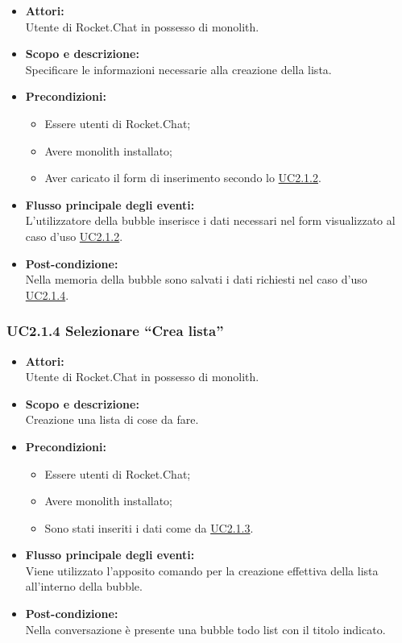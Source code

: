 \begin{itemize}
	\item \textbf{Attori:}
	\\Utente di Rocket.Chat in possesso di monolith.
	\item \textbf{Scopo e descrizione:} 
	\\Specificare le informazioni necessarie alla creazione della lista.
	\item \textbf{Precondizioni:}
	\begin{itemize}
		\item Essere utenti di Rocket.Chat;
		\item Avere monolith installato;
		\item Aver caricato il form di inserimento secondo lo \hyperref[UC2.1.2]{UC2.1.2}.
	\end{itemize}
	\item \textbf{Flusso principale degli eventi:}
	\\L'utilizzatore della bubble inserisce i dati necessari nel form visualizzato al caso d’uso \hyperref[UC2.1.2]{UC2.1.2}.
	\item \textbf{Post-condizione:}
	\\Nella memoria della bubble sono salvati i dati richiesti nel caso d’uso \hyperref[UC2.1.4]{UC2.1.4}. 
\end{itemize}

\subsubsection{UC2.1.4 Selezionare “Crea lista”} \label{UC2.1.4}

\begin{itemize}
	\item \textbf{Attori:}
	\\Utente di Rocket.Chat in possesso di monolith.
	\item \textbf{Scopo e descrizione:} 
	\\Creazione una lista di cose da fare.
	\item \textbf{Precondizioni:}
	\begin{itemize}
		\item Essere utenti di Rocket.Chat;
		\item Avere monolith installato;
		\item Sono stati inseriti i dati come da \hyperref[UC2.1.3]{UC2.1.3}.
	\end{itemize}
	\item \textbf{Flusso principale degli eventi:}
	\\Viene utilizzato l'apposito comando per la creazione effettiva della lista all'interno della bubble.
	\item \textbf{Post-condizione:}
	\\Nella conversazione è presente una bubble todo list con il titolo indicato. 
\end{itemize}

